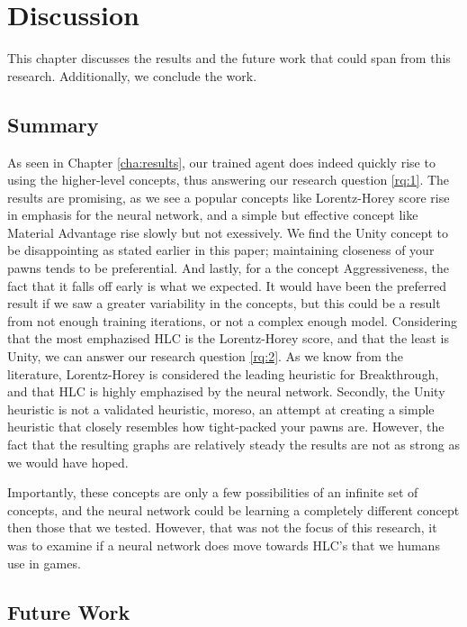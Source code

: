\chapter{Discussion}

This chapter discusses the results and the future work that could span from this research. Additionally, we conclude the work.

\section{Summary}

As seen in Chapter \ref{cha:results}, our trained agent does indeed quickly rise to using the higher-level concepts, thus answering our research question \ref{rq:1}. The results are promising, as we see a popular concepts like Lorentz-Horey score rise in emphasis for the neural network, and a simple but effective concept like Material Advantage rise slowly but not exessively. We find the Unity concept to be disappointing as stated earlier in this paper; maintaining closeness of your pawns tends to be preferential. And lastly, for a the concept Aggressiveness, the fact that it falls off early is what we expected. It would have been the preferred result if we saw a greater variability in the concepts, but this could be a result from not enough training iterations, or not a complex enough model. Considering that the most emphazised HLC is the Lorentz-Horey score, and that the least is Unity, we can answer our research question \ref{rq:2}. As we know from the literature, Lorentz-Horey is considered the leading heuristic for Breakthrough, and that HLC is highly emphazised by the neural network. Secondly, the Unity heuristic is not a validated heuristic, moreso, an attempt at creating a simple heuristic that closely resembles how tight-packed your pawns are. However, the fact that the resulting graphs are relatively steady the results are not as strong as we would have hoped. 

Importantly, these concepts are only a few possibilities of an infinite set of concepts, and the neural network could be learning a completely different concept then those that we tested. However, that was not the focus of this research, it was to examine if a neural network does move towards HLC's that we humans use in games.

\section{Future Work}

